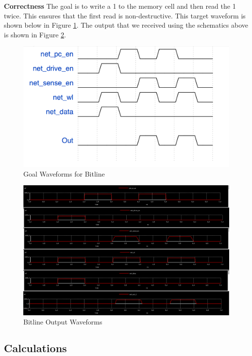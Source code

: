 \documentclass[a4paper]{article}
\begin{document}
\textbf{Correctness}
The goal is to write a 1 to the memory cell and then read the 1 twice. This ensures that the first read is non-destructive. This target waveform is shown below in Figure \ref{fig:bitlineGoalWave}. The output that we received using the schematics above is shown in Figure \ref{fig:bitlineActualWave}.

\begin{figure}[H]
	\centering
	\includegraphics[scale=0.4]{exampleBitlineGoalWaveform}
	\caption{Goal Waveforms for Bitline}
	\label{fig:bitlineGoalWave}
\end{figure}

\begin{figure}[H]
	\centering
	\includegraphics[scale=0.25]{exampleBitlineOutputWaveform}
	\caption{Bitline Output Waveforms}
	\label{fig:bitlineActualWave}
\end{figure}

\subsection{Calculations}
\end{document}
